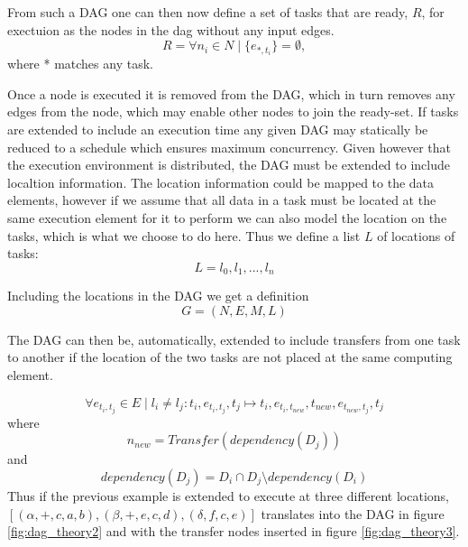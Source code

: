\documentclass[preprint]{../PGAS10/sigplanconf}
\begin{document}
From such a DAG one can then now define a set of tasks that are ready, $R$, for exectuion as the nodes in the dag without any input edges.
\begin{equation*}
R = \forall n_i \in N \mid \{e_{*,t_i}\} = \emptyset,
\end{equation*}
where * matches any task.

Once a node is executed it is removed from the DAG, which in turn removes any edges from the node, which may enable other nodes to join the ready-set. If tasks are extended to include an execution time any given DAG may statically be reduced to a schedule which ensures maximum concurrency. Given however that the execution environment is distributed, the DAG must be extended to include localtion information. The location information could be mapped to the data elements, however if we assume that all data in a task must be located at the same execution element for it to perform we can also model the location on the tasks, which is what we choose to do here. Thus we define a list $L$ of locations of tasks:
\begin{equation*}
L={l_0,l_1,...,l_n}
\end{equation*}

Including the locations in the DAG we get a definition
\begin{equation*}
G=(N,E,M,L)
\end{equation*}


The DAG can then be, automatically, extended to include transfers from one task to another if the location of the two tasks are not placed at the same computing element.

\begin{equation*}
\forall e_{t_i,t_j} \in E \mid l_i \neq l_j : t_i,e_{t_i,t_j},t_j \mapsto t_i,e_{t_i,t_{new}},t_{new},e_{t_{new},t_j},t_j
\end{equation*}
where
\begin{equation*}
n_{new} = Transfer(dependency(D_j))
\end{equation*}
and
\begin{equation*}
dependency(D_j) = D_i \cap D_j \setminus dependency(D_i)
\end{equation*}
Thus if the previous example is extended to execute at three different locations, $[(\alpha,+,c,a,b),(\beta,+,e,c,d),(\delta, f,c,e)]$ translates into the DAG in figure \ref{fig:dag_theory2} and with the transfer nodes inserted in figure \ref{fig:dag_theory3}.
\end{document}
